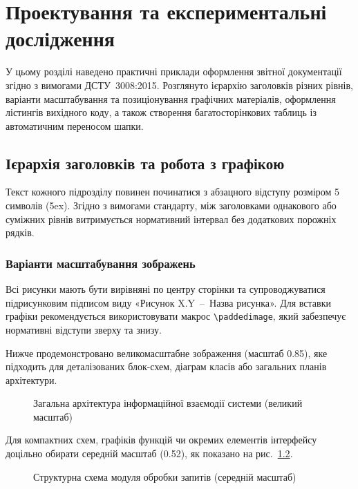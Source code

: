 \chapter{Проектування та експериментальні дослідження}
\label{chapter:development-and-analysis}

У цьому розділі наведено практичні приклади оформлення звітної документації згідно з вимогами ДСТУ~3008:2015. Розглянуто ієрархію заголовків різних рівнів, варіанти масштабування та позиціонування графічних матеріалів, оформлення лістингів вихідного коду, а також створення багатосторінкових таблиць із автоматичним переносом шапки.

\section{Ієрархія заголовків та робота з графікою}
\label{sec:headings-and-graphics}

Текст кожного підрозділу повинен починатися з абзацного відступу розміром 5 символів (5ex). Згідно з вимогами стандарту, між заголовками однакового або суміжних рівнів витримується нормативний інтервал без додаткових порожніх рядків.

\subsection{Варіанти масштабування зображень}
\label{subsec:image-scaling}

Всі рисунки мають бути вирівняні по центру сторінки та супроводжуватися підрисунковим підписом виду «Рисунок X.Y~--~Назва рисунка». Для вставки графіки рекомендується використовувати макрос \texttt{\textbackslash paddedimage}, який забезпечує нормативні відступи зверху та знизу.

Нижче продемонстровано великомасштабне зображення (масштаб 0.85), яке підходить для деталізованих блок-схем, діаграм класів або загальних планів архітектури.

\begin{figure}[H]
    \centering
    \caption{Загальна архітектура інформаційної взаємодії системи (великий масштаб)}
    \label{fig:arch-wide}
\end{figure}

Для компактних схем, графіків функцій чи окремих елементів інтерфейсу доцільно обирати середній масштаб (0.52), як показано на рис.~\ref{fig:component-medium}.

\begin{figure}[H]
    \centering
    \caption{Структурна схема модуля обробки запитів (середній масштаб)}
    \label{fig:component-medium}
\end{figure}

